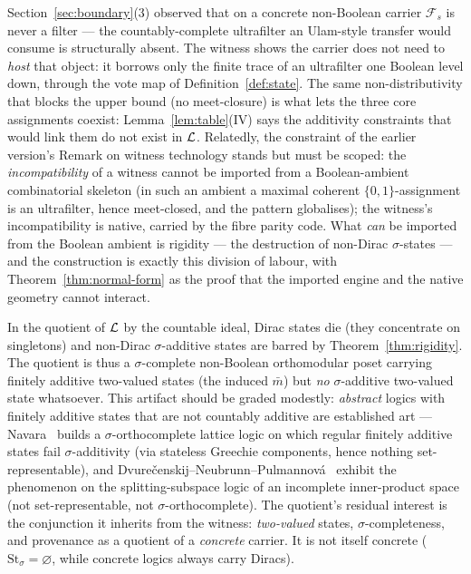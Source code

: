 \begin{remark}\label{rem:coherence-location}
Section~\ref{sec:boundary}(3) observed that on a concrete non-Boolean carrier
$\mathcal F_s$ is never a filter --- the countably-complete ultrafilter an
Ulam-style transfer would consume is structurally absent. The witness shows the
carrier does not need to \emph{host} that object: it borrows only the finite
trace of an ultrafilter one Boolean level down, through the vote map of
Definition~\ref{def:state}. The same non-distributivity that blocks the upper
bound (no meet-closure) is what lets the three core assignments coexist:
Lemma~\ref{lem:table}(IV) says the additivity constraints that would link them
do not exist in $\mathcal{L}$. Relatedly, the constraint of the earlier version's
Remark on witness technology stands but must be scoped: the
\emph{incompatibility} of a witness cannot be imported from a Boolean-ambient
combinatorial skeleton (in such an ambient a maximal coherent
$\{0,1\}$-assignment is an ultrafilter, hence meet-closed, and the pattern
globalises); the witness's incompatibility is native, carried by the fibre
parity code. What \emph{can} be imported from the Boolean ambient is rigidity
--- the destruction of non-Dirac $\sigma$-states --- and the construction is
exactly this division of labour, with Theorem~\ref{thm:normal-form} as the proof
that the imported engine and the native geometry cannot interact.
\end{remark}

\begin{remark}\label{rem:quotient}
In the quotient of $\mathcal{L}$ by the countable ideal, Dirac states die (they
concentrate on singletons) and non-Dirac $\sigma$-additive states are barred by
Theorem~\ref{thm:rigidity}. The quotient is thus a $\sigma$-complete non-Boolean
orthomodular poset carrying finitely additive two-valued states (the induced
$\bar m$) but \emph{no} $\sigma$-additive two-valued state whatsoever. This
artifact should be graded modestly: \emph{abstract} logics with finitely
additive states that are not countably additive are established art ---
Navara~\cite{Navara1992} builds a $\sigma$-orthocomplete lattice logic on which
regular finitely additive states fail $\sigma$-additivity (via stateless
Greechie components, hence nothing set-representable), and
Dvure\v{c}enskij--Neubrunn--Pulmannov\'a~\cite{DvurecenskijNeubrunnPulmannova1992}
exhibit the phenomenon on the splitting-subspace logic of an incomplete
inner-product space (not set-representable, not $\sigma$-orthocomplete). The
quotient's residual interest is the conjunction it inherits from the witness:
\emph{two-valued} states, $\sigma$-completeness, and provenance as a quotient
of a \emph{concrete} carrier. It is not itself concrete
($\mathrm{St}_\sigma = \varnothing$, while concrete logics always carry
Diracs).
\end{remark}

